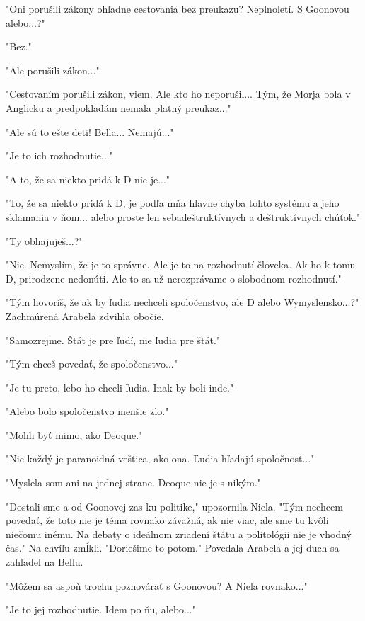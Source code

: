 \documentclass{book}
\begin{document}
"$ $Oni porušili zákony ohľadne cestovania bez preukazu? Neplnoletí. S Goonovou alebo...?"$ $ 

"$ $Bez."$ $ 

"$ $Ale porušili zákon..."$ $ 

"$ $Cestovaním porušili zákon, viem. Ale kto ho neporušil... Tým, že Morja bola v Anglicku a predpokladám nemala platný preukaz..."$ $ 

"$ $Ale sú to ešte deti! Bella... Nemajú..."$ $ 

"$ $Je to ich rozhodnutie..."$ $ 

"$ $A to, že sa niekto pridá k D nie je..."$ $ 

"$ $To, že sa niekto pridá k D, je podľa mňa hlavne chyba tohto systému a jeho sklamania v ňom... alebo proste len sebadeštruktívnych a deštruktívnych chúťok."$ $ 

"$ $Ty obhajuješ...?"$ $ 

"$ $Nie. Nemyslím, že je to správne. Ale je to na rozhodnutí človeka. Ak ho k tomu D, prirodzene nedonúti. Ale to sa už nerozprávame o slobodnom rozhodnutí."$ $ 

"$ $Tým hovoríš, že ak by ľudia nechceli spoločenstvo, ale D alebo Wymyslensko...?"$ $  Zachmúrená Arabela zdvihla obočie.

"$ $Samozrejme. Štát je pre ľudí, nie ľudia pre štát."$ $ 

"$ $Tým chceš povedať, že spoločenstvo..."$ $ 

"$ $Je tu preto, lebo ho chceli ľudia. Inak by boli inde."$ $ 

"$ $Alebo bolo spoločenstvo menšie zlo."$ $ 

"$ $Mohli byť mimo, ako Deoque."$ $ 

"$ $Nie každý je paranoidná veštica, ako ona. Ľudia hľadajú spoločnosť..."$ $ 

"$ $Myslela som ani na jednej strane. Deoque nie je s nikým."$ $ 

"$ $Dostali sme a od Goonovej zas ku politike,"$ $  upozornila Niela. "$ $Tým nechcem povedať, že toto nie je téma rovnako závažná, ak nie viac, ale sme tu kvôli niečomu inému. Na debaty o ideálnom zriadení štátu a politológii nie je vhodný čas."$ $  Na chvíľu zmĺkli. "$ $Doriešime to potom."$ $  Povedala Arabela a jej duch sa zahľadel na Bellu.

"$ $Môžem sa aspoň trochu pozhovárať s Goonovou? A Niela rovnako..."$ $ 

"$ $Je to jej rozhodnutie. Idem po ňu, alebo..."$ $ 
\end{document}
